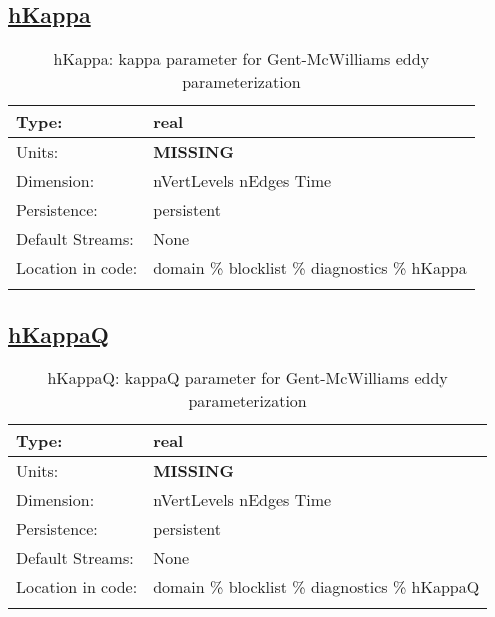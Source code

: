\subsection[hKappa]{\hyperref[sec:var_tab_diagnostics]{hKappa}}
\label{subsec:var_sec_diagnostics_hKappa}
\begin{center}
\begin{longtable}{| p{2.0in} | p{4.0in} |}
        \hline 
        Type: & real \\
        \hline 
        Units: & {\bf \color{red} MISSING} \\
        \hline 
        Dimension: & nVertLevels nEdges Time \\
        \hline 
        Persistence: & persistent \\
        \hline 
		 Default Streams: & None \\
        \hline 
		 Location in code: & domain \% blocklist \% diagnostics \% hKappa \\
		 \hline 
    \caption{hKappa: kappa parameter for Gent-McWilliams eddy parameterization}
\end{longtable}
\end{center}
\subsection[hKappaQ]{\hyperref[sec:var_tab_diagnostics]{hKappaQ}}
\label{subsec:var_sec_diagnostics_hKappaQ}
\begin{center}
\begin{longtable}{| p{2.0in} | p{4.0in} |}
        \hline 
        Type: & real \\
        \hline 
        Units: & {\bf \color{red} MISSING} \\
        \hline 
        Dimension: & nVertLevels nEdges Time \\
        \hline 
        Persistence: & persistent \\
        \hline 
		 Default Streams: & None \\
        \hline 
		 Location in code: & domain \% blocklist \% diagnostics \% hKappaQ \\
		 \hline 
    \caption{hKappaQ: kappaQ parameter for Gent-McWilliams eddy parameterization}
\end{longtable}
\end{center}
